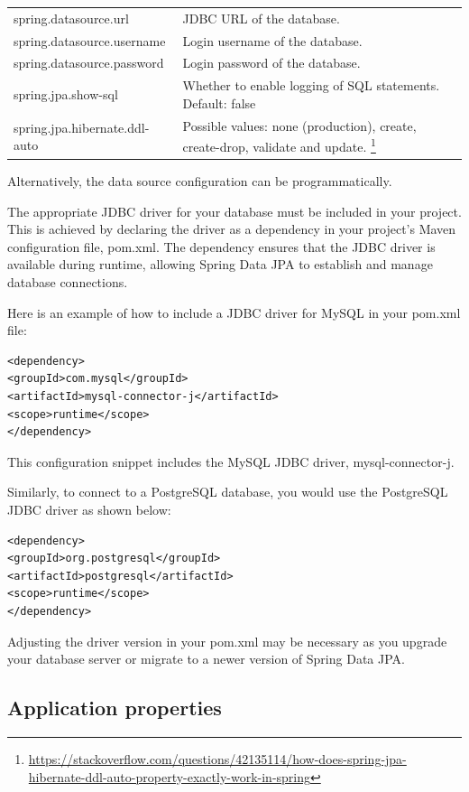 \begin{tabular}{|l|p{8cm}|}
\hline
spring.datasource.url & JDBC URL of the database.\\
spring.datasource.username & Login username of the database.\\
spring.datasource.password & Login password of the database.\\
spring.jpa.show-sql & Whether to enable logging of SQL statements. Default: false\\
spring.jpa.hibernate.ddl-auto & Possible values: none (production), create, create-drop, validate and update. \footnote{\url{https://stackoverflow.com/questions/42135114/how-does-spring-jpa-hibernate-ddl-auto-property-exactly-work-in-spring}}\\
\hline
\end{tabular}

Alternatively, the data source configuration can be programmatically.

The appropriate JDBC driver for your database must be included in your project. This is achieved by declaring the driver as a dependency in your project's Maven configuration file, pom.xml. The dependency ensures that the JDBC driver is available during runtime, allowing Spring Data JPA to establish and manage database connections.

Here is an example of how to include a JDBC driver for MySQL in your pom.xml file:

\begin{lstlisting}
<dependency>
<groupId>com.mysql</groupId>
<artifactId>mysql-connector-j</artifactId>
<scope>runtime</scope>
</dependency>
\end{lstlisting}

This configuration snippet includes the MySQL JDBC driver, mysql-connector-j.

Similarly,  to connect to a PostgreSQL database, you would use the PostgreSQL JDBC driver as shown below:

\begin{lstlisting}
<dependency>
<groupId>org.postgresql</groupId>
<artifactId>postgresql</artifactId>
<scope>runtime</scope>
</dependency>
\end{lstlisting}

Adjusting the driver version in your pom.xml may be necessary as you upgrade your database server or migrate to a newer version of Spring Data JPA.

\subsection{Application properties}

